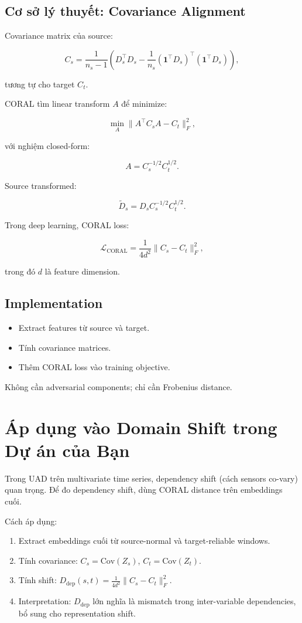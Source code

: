 \documentclass[a4paper]{article}
\begin{document}
\subsection{Cơ sở lý thuyết: Covariance Alignment}

Covariance matrix của source:

\[
C_s = \frac{1}{n_s - 1} (D_s^\top D_s - \frac{1}{n_s} (\mathbf{1}^\top D_s)^\top (\mathbf{1}^\top D_s)),
\]

tương tự cho target $C_t$.

CORAL tìm linear transform $A$ để minimize:

\[
\min_A \| A^\top C_s A - C_t \|_F^2,
\]

với nghiệm closed-form:

\[
A = C_s^{-1/2} C_t^{1/2}.
\]

Source transformed:

\[
\widetilde{D}_s = D_s C_s^{-1/2} C_t^{1/2}.
\]

Trong deep learning, CORAL loss:

\[
\mathcal{L}_{\mathrm{CORAL}} = \frac{1}{4d^2} \| C_s - C_t \|_F^2,
\]

trong đó $d$ là feature dimension.

\subsection{Implementation}

\begin{itemize}
    \item Extract features từ source và target.
    \item Tính covariance matrices.
    \item Thêm CORAL loss vào training objective.
\end{itemize}

Không cần adversarial components; chỉ cần Frobenius distance.

\section{Áp dụng vào Domain Shift trong Dự án của Bạn}

Trong UAD trên multivariate time series, dependency shift (cách sensors co-vary) quan trọng. Để đo dependency shift, dùng CORAL distance trên embeddings cuối.

Cách áp dụng:
\begin{enumerate}[label=\arabic*.]
    \item Extract embeddings cuối từ source-normal và target-reliable windows.
    \item Tính covariance: $C_s = \mathrm{Cov}(Z_s)$, $C_t = \mathrm{Cov}(Z_t)$.
    \item Tính shift: $D_{\mathrm{dep}}(s,t) = \frac{1}{4d^2} \| C_s - C_t \|_F^2$.
    \item Interpretation: $D_{\mathrm{dep}}$ lớn nghĩa là mismatch trong inter-variable dependencies, bổ sung cho representation shift.
\end{enumerate}
\end{document}
